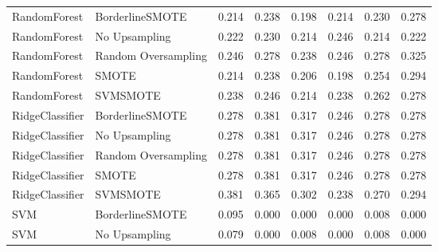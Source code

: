 \begin{tabular}{llllllll}
                RandomForest &     BorderlineSMOTE & 0.214 &                     0.238 &                 0.198 &                  0.214 &                                   0.230 &     0.278 \\
                RandomForest &       No Upsampling & 0.222 &                     0.230 &                 0.214 &                  0.246 &                                   0.214 &     0.222 \\
                RandomForest & Random Oversampling & 0.246 &                     0.278 &                 0.238 &                  0.246 &                                   0.278 &     0.325 \\
                RandomForest &               SMOTE & 0.214 &                     0.238 &                 0.206 &                  0.198 &                                   0.254 &     0.294 \\
                RandomForest &            SVMSMOTE & 0.238 &                     0.246 &                 0.214 &                  0.238 &                                   0.262 &     0.278 \\
             RidgeClassifier &     BorderlineSMOTE & 0.278 &                     0.381 &                 0.317 &                  0.246 &                                   0.278 &     0.278 \\
             RidgeClassifier &       No Upsampling & 0.278 &                     0.381 &                 0.317 &                  0.246 &                                   0.278 &     0.278 \\
             RidgeClassifier & Random Oversampling & 0.278 &                     0.381 &                 0.317 &                  0.246 &                                   0.278 &     0.278 \\
             RidgeClassifier &               SMOTE & 0.278 &                     0.381 &                 0.317 &                  0.246 &                                   0.278 &     0.278 \\
             RidgeClassifier &            SVMSMOTE & 0.381 &                     0.365 &                 0.302 &                  0.238 &                                   0.270 &     0.294 \\
                         SVM &     BorderlineSMOTE & 0.095 &                     0.000 &                 0.000 &                  0.000 &                                   0.008 &     0.000 \\
                         SVM &       No Upsampling & 0.079 &                     0.000 &                 0.008 &                  0.000 &                                   0.008 &     0.000 \\

\end{tabular}
